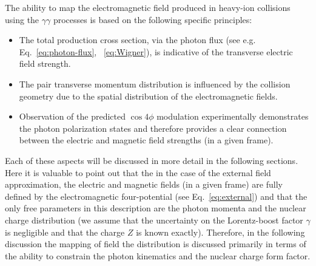 \documentclass[12pt,epjc3]{svjour3}\sloppy
\begin{document}
The ability to map the electromagnetic field produced in heavy-ion collisions using the $\gamma\gamma$ processes is based on the following specific principles:
\begin{itemize}
  \item The total production cross section, via the photon flux (see e.g. Eq.~\ref{eq:photon-flux}, ~\ref{eq:Wigner}), is indicative of the transverse electric field strength.
  \item The pair transverse momentum distribution is influenced by the collision geometry due to the spatial distribution of the electromagnetic fields. 
  \item Observation of the predicted $\cos4\phi$ modulation experimentally demonstrates the photon polarization states and therefore provides a clear connection between the electric and magnetic field strengths (in a given frame).
\end{itemize}

Each of these aspects will be discussed in more detail in the following sections. Here it is valuable to point out that the in the case of the external field approximation, the electric and magnetic fields (in a given frame) are fully defined by the electromagnetic four-potential (see Eq.~\ref{eq:external}) and that the only free parameters in this description are the photon momenta and the nuclear charge distribution (we assume that the uncertainty on the Lorentz-boost factor $\gamma$ is negligible and that the charge $Z$ is known exactly). Therefore, in the following discussion the mapping of field the distribution is discussed primarily in terms of the ability to constrain the photon kinematics and the nuclear charge form factor. 
\end{document}
